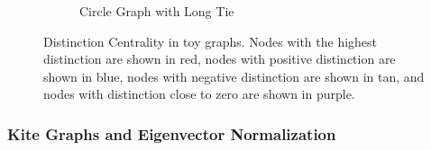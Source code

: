 \documentclass[12pt]{article}
\begin{document}
\begin{figure}
\begin{subfigure}[b]{0.3\textwidth}
            \caption{Circle Graph with Long Tie}
            \label{fig:circleplus}
    \end{subfigure}
    \caption{Distinction Centrality in toy graphs. Nodes with the highest distinction are shown in red, nodes with positive distinction are shown in blue, nodes with negative distinction are shown in tan, and nodes with distinction close to zero are shown in purple.}
    \label{fig:toys}
\end{figure}












\subsubsection{Kite Graphs and Eigenvector Normalization}


\end{document}
